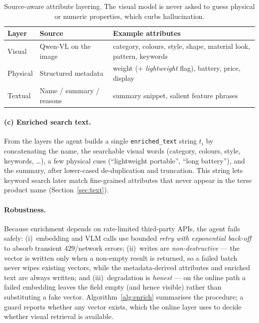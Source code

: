 \begin{table}[t]
  \centering
  \caption{Source-aware attribute layering. The visual model is never asked to
  guess physical or numeric properties, which curbs hallucination.}
  \label{tab:layering}
  \begin{tabular}{@{}lll@{}}
    \toprule
    \textbf{Layer} & \textbf{Source} & \textbf{Example attributes} \\
    \midrule
    Visual   & Qwen-VL on the image     & category, colours, style, shape, material look, pattern, keywords \\
    Physical & Structured metadata      & weight (+ \emph{lightweight} flag), battery, price, display \\
    Textual  & Name / summary / reasons & summary snippet, salient feature phrases \\
    \bottomrule
  \end{tabular}
\end{table}

\paragraph{(c) Enriched search text.}
From the layers the agent builds a single \texttt{enriched\_text} string $t_i$ by
concatenating the name, the searchable visual words (category, colours, style,
keywords, \dots), a few physical cues (``lightweight portable'', ``long
battery''), and the summary, after lower-cased de-duplication and truncation.
This string lets keyword search later match fine-grained attributes that never
appear in the terse product name (Section~\ref{sec:text}).

\paragraph{Robustness.}
Because enrichment depends on rate-limited third-party APIs, the agent fails
safely: (i)~embedding and VLM calls use bounded \emph{retry with exponential
back-off} to absorb transient $429$/network errors; (ii)~writes are
\emph{non-destructive} --- the vector is written only when a non-empty result is
returned, so a failed batch never wipes existing vectors, while the
metadata-derived attributes and enriched text are always written; and
(iii)~degradation is \emph{honest} --- on the online path a failed embedding
leaves the field empty (and hence visible) rather than substituting a fake
vector. Algorithm~\ref{alg:enrich} summarises the procedure; a guard
 reports whether any vector exists, which the online
layer uses to decide whether visual retrieval is available.

